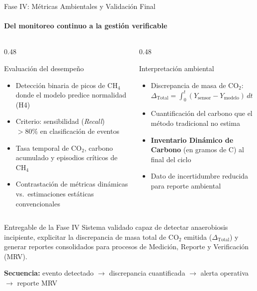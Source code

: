 \documentclass[aspectratio=169, 11pt]{beamer}
\begin{document}
\begin{frame}{Fase IV: Métricas Ambientales y Validación Final}
\framesubtitle{Del monitoreo continuo a la gestión verificable}

\begin{columns}[T,onlytextwidth]

\begin{column}{0.48\textwidth}

\begin{block}{Evaluación del desempeño}
\scriptsize
\begin{itemize}
    \item Detección binaria de picos de CH$_4$ donde el modelo predice normalidad (H4)
    \item Criterio: sensibilidad (\textit{Recall}) $> 80\%$ en clasificación de eventos
    \item Tasa temporal de CO$_2$, carbono acumulado y episodios críticos de CH$_4$
    \item Contrastación de métricas dinámicas vs.\ estimaciones estáticas convencionales
\end{itemize}
\end{block}

\end{column}

\begin{column}{0.48\textwidth}

\begin{block}{Interpretación ambiental}
\scriptsize
\begin{itemize}
    \item Discrepancia de masa de CO$_2$: $\Delta_{\text{Total}} = \int_{0}^{t} (Y_{\text{sensor}} - Y_{\text{modelo}})\,dt$
    \item Cuantificación del carbono que el método tradicional no estima
    \item \textbf{Inventario Dinámico de Carbono} (en gramos de C) al final del ciclo
    \item Dato de incertidumbre reducida para reporte ambiental
\end{itemize}
\end{block}

\end{column}

\end{columns}

\vspace{0.20cm}

\begin{alertblock}{Entregable de la Fase IV}
\scriptsize
Sistema validado capaz de detectar anaerobiosis incipiente, explicitar la discrepancia de masa total de CO$_2$ emitida ($\Delta_{\text{Total}}$) y generar reportes consolidados para procesos de Medición, Reporte y Verificación (MRV).
\end{alertblock}

\vspace{0.15cm}
\centering
\scriptsize
\textbf{Secuencia:} evento detectado $\rightarrow$ discrepancia cuantificada $\rightarrow$ alerta operativa $\rightarrow$ reporte MRV
\end{frame}
\end{document}
